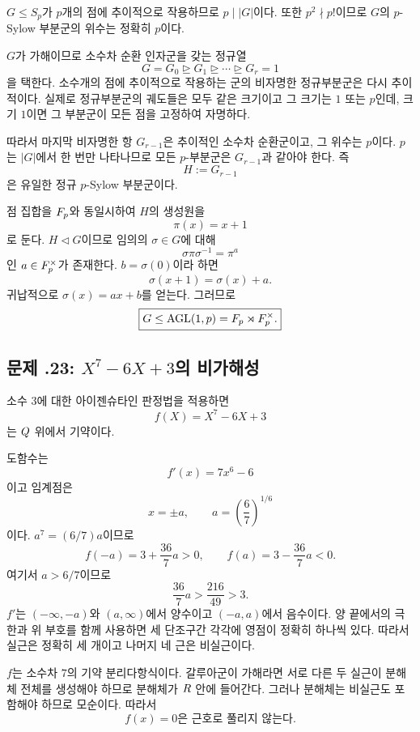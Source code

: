 \begin{solution}
$G\le S_p$가 $p$개의 점에 추이적으로 작용하므로 $p\mid|G|$이다.
또한 $p^2\nmid p!$이므로 $G$의 $p$-Sylow 부분군의 위수는 정확히
$p$이다.

$G$가 가해이므로 소수차 순환 인자군을 갖는 정규열
\[
  G=G_0\trianglerighteq G_1\trianglerighteq\cdots
  \trianglerighteq G_r=1
\]
을 택한다. 소수개의 점에 추이적으로 작용하는 군의 비자명한
정규부분군은 다시 추이적이다. 실제로 정규부분군의 궤도들은 모두
같은 크기이고 그 크기는 $1$ 또는 $p$인데, 크기 $1$이면 그 부분군이
모든 점을 고정하여 자명하다.

따라서 마지막 비자명한 항 $G_{r-1}$은 추이적인 소수차 순환군이고,
그 위수는 $p$이다. $p$는 $|G|$에서 한 번만 나타나므로 모든
$p$-부분군은 $G_{r-1}$과 같아야 한다. 즉
\[
  H:=G_{r-1}
\]
은 유일한 정규 $p$-Sylow 부분군이다.

점 집합을 $F_p$와 동일시하여 $H$의 생성원을
\[
  \pi(x)=x+1
\]
로 둔다. $H\triangleleft G$이므로 임의의 $\sigma\in G$에 대해
\[
  \sigma\pi\sigma^{-1}=\pi^a
\]
인 $a\in F_p^\times$가 존재한다. $b=\sigma(0)$이라 하면
\[
  \sigma(x+1)=\sigma(x)+a.
\]
귀납적으로 $\sigma(x)=ax+b$를 얻는다. 그러므로
\[
  \boxed{G\le\operatorname{AGL}(1,p)
  =F_p\rtimes F_p^\times.}
\]
\end{solution}

\subsection*{문제 \thechapter.23: $X^7-6X+3$의 비가해성}

\begin{solution}
소수 $3$에 대한 아이젠슈타인 판정법을 적용하면
\[
  f(X)=X^7-6X+3
\]
는 $Q$ 위에서 기약이다.

도함수는
\[
  f'(x)=7x^6-6
\]
이고 임계점은
\[
  x=\pm a,
  \qquad
  a=\left(\frac67\right)^{1/6}
\]
이다. $a^7=(6/7)a$이므로
\[
  f(-a)=3+\frac{36}{7}a>0,
  \qquad
  f(a)=3-\frac{36}{7}a<0.
\]
여기서 $a>6/7$이므로
\[
  \frac{36}{7}a>
  \frac{216}{49}>3.
\]
$f'$는 $(-\infty,-a)$와 $(a,\infty)$에서 양수이고 $(-a,a)$에서
음수이다. 양 끝에서의 극한과 위 부호를 함께 사용하면 세 단조구간
각각에 영점이 정확히 하나씩 있다. 따라서 실근은 정확히 세 개이고
나머지 네 근은 비실근이다.

$f$는 소수차 $7$의 기약 분리다항식이다. 갈루아군이 가해라면 서로
다른 두 실근이 분해체 전체를 생성해야 하므로 분해체가 $R$ 안에
들어간다. 그러나 분해체는 비실근도 포함해야 하므로 모순이다. 따라서
\[
  \boxed{f(x)=0\text{은 근호로 풀리지 않는다}.}
\]
\end{solution}


